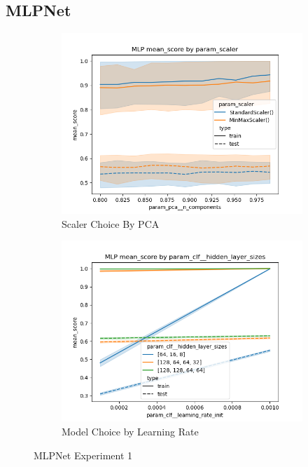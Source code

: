 \documentclass[12pt]{article}
\begin{document}
\subsection{MLPNet}
\begin{figure}
    \begin{subfigure}{.5\textwidth}
        \includegraphics[width=.95\textwidth]{../../results_Experiment1/mlp/param_scaler_mean_score_param_pca__n_components.png}
        \caption{Scaler Choice By PCA}
        \end{subfigure}%
      \begin{subfigure}{.5\textwidth}
        \includegraphics[width=.95\textwidth]{../../results_Experiment1/mlp/param_clf__hidden_layer_sizes_mean_score_param_clf__learning_rate_init.png}
        \caption{Model Choice by Learning Rate}
      \end{subfigure}
      \caption{MLPNet Experiment 1}
      \label{figure2}
\end{figure}
\end{document}
